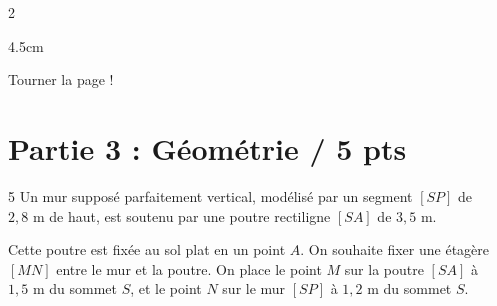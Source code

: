 \documentclass[a4paper]{book}
\begin{document}
{\begin{exerciceNote}{2}
\begin{enumerate}
            \begin{ZoneReponse}{4.5cm}
            \end{ZoneReponse}
        \end{enumerate}
    \end{exerciceNote}
    
    
\vfill
\hfill Tourner la page !
\newpage

\section*{Partie 3 : Géométrie \points[2]/ 5 pts }


    \begin{exerciceNote}{5}
        Un mur supposé parfaitement vertical, modélisé par un segment $[SP]$ de $2,8\text{ m}$ de haut, est soutenu par une poutre rectiligne $[SA]$ de $3,5\text{ m}$. 
        
        Cette poutre est fixée au sol plat en un point $A$.
        On souhaite fixer une étagère $[MN]$ entre le mur et la poutre. On place le point $M$ sur la poutre $[SA]$ à $1,5\text{ m}$ du sommet $S$, et le point $N$ sur le mur $[SP]$ à $1,2\text{ m}$ du sommet $S$.
        
        \medskip
        \begin{center}
        \end{center}
        \medskip
        

\end{exerciceNote}}
\end{document}
